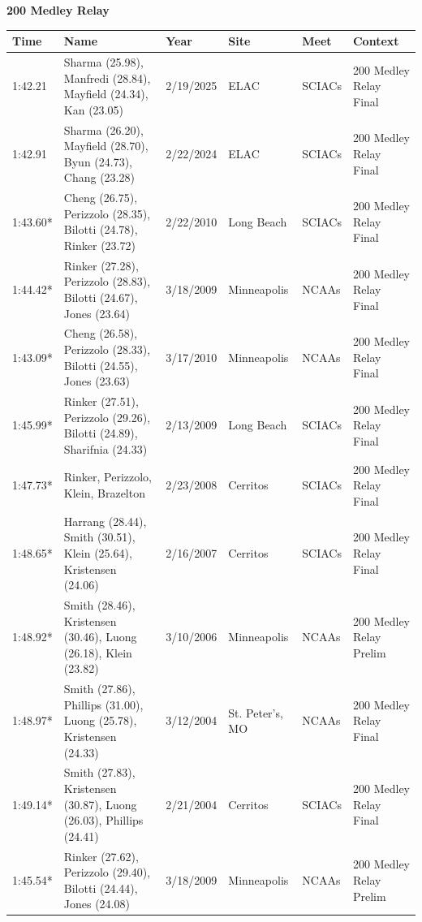 \begin{table}[H]
\centering
\begin{minipage}[t]{0.6\textwidth}
\centering
\textbf{200 Medley Relay}\\[0.1cm]
\begin{tabular}{@{}p{1.8cm}p{2.8cm}p{1.2cm}p{1.4cm}p{1.4cm}p{2.0cm}@{}}
\hline
    \textbf{Time} & \textbf{Name} & \textbf{Year} & \textbf{Site} & \textbf{Meet} & \textbf{Context} \\
\hline
    1:42.21 & Sharma (25.98), Manfredi (28.84), Mayfield (24.34), Kan (23.05) & 2/19/2025 & ELAC & SCIACs & 200 Medley Relay Final \\
    1:42.91 & Sharma (26.20), Mayfield (28.70), Byun (24.73), Chang (23.28) & 2/22/2024 & ELAC & SCIACs & 200 Medley Relay Final \\
    1:43.60* & Cheng (26.75), Perizzolo (28.35), Bilotti (24.78), Rinker (23.72) & 2/22/2010 & Long Beach & SCIACs & 200 Medley Relay Final \\
    1:44.42* & Rinker (27.28), Perizzolo (28.83), Bilotti (24.67), Jones (23.64) & 3/18/2009 & Minneapolis & NCAAs & 200 Medley Relay Final \\
    1:43.09* & Cheng (26.58), Perizzolo (28.33), Bilotti (24.55), Jones (23.63) & 3/17/2010 & Minneapolis & NCAAs & 200 Medley Relay Final \\
    1:45.99* & Rinker (27.51), Perizzolo (29.26), Bilotti (24.89), Sharifnia (24.33) & 2/13/2009 & Long Beach & SCIACs & 200 Medley Relay Final \\
    1:47.73* & Rinker, Perizzolo, Klein, Brazelton & 2/23/2008 & Cerritos & SCIACs & 200 Medley Relay Final \\
    1:48.65* & Harrang (28.44), Smith (30.51), Klein (25.64), Kristensen (24.06) & 2/16/2007 & Cerritos & SCIACs & 200 Medley Relay Final \\
    1:48.92* & Smith (28.46), Kristensen (30.46), Luong (26.18), Klein (23.82) & 3/10/2006 & Minneapolis & NCAAs & 200 Medley Relay Prelim \\
    1:48.97* & Smith (27.86), Phillips (31.00), Luong (25.78), Kristensen (24.33) & 3/12/2004 & St. Peter's, MO & NCAAs & 200 Medley Relay Final \\
    1:49.14* & Smith (27.83), Kristensen (30.87), Luong (26.03), Phillips (24.41) & 2/21/2004 & Cerritos & SCIACs & 200 Medley Relay Final \\
    1:45.54* & Rinker (27.62), Perizzolo (29.40), Bilotti (24.44), Jones (24.08) & 3/18/2009 & Minneapolis & NCAAs & 200 Medley Relay Prelim \\
\hline
\end{tabular}
\end{minipage}
\end{table}

